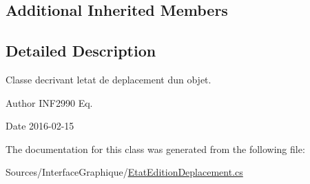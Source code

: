 \subsection*{Additional Inherited Members}


\subsection{Detailed Description}
Classe decrivant l\textquotesingle{}etat de deplacement d\textquotesingle{}un objet. 

\begin{DoxyAuthor}{Author}
I\+N\+F2990 Eq. 
\end{DoxyAuthor}
\begin{DoxyDate}{Date}
2016-\/02-\/15 
\end{DoxyDate}


The documentation for this class was generated from the following file\+:\begin{DoxyCompactItemize}
\item 
Sources/\+Interface\+Graphique/\hyperlink{_etat_edition_deplacement_8cs}{Etat\+Edition\+Deplacement.\+cs}\end{DoxyCompactItemize}

